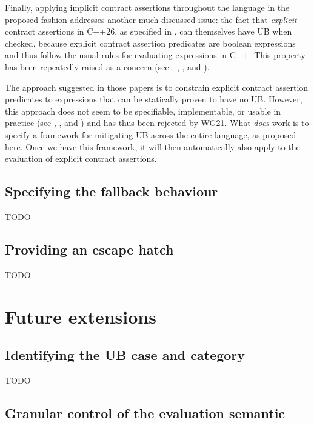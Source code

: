 Finally, applying implicit contract assertions throughout the language in the proposed fashion addresses another much-discussed issue: the fact that \emph{explicit} contract assertions in C++26, as specified in \cite{P2900R14}, can themselves have UB when checked, because explicit contract assertion predicates are boolean expressions and thus follow the usual rules for evaluating expressions in C++. This property has been repeatedly raised as a concern (see \cite{P2680R1}, \cite{P3173R0}, \cite{P3285R0}, and \cite{P3362R0}).

The approach suggested in those papers is to constrain explicit contract assertion predicates to expressions that can be statically proven to have no UB. However, this approach does not seem to be specifiable, implementable, or usable in practice (see  \cite{P3376R0}, \cite{P3386R0}, and \cite{P3499R1}) and has thus been rejected by WG21. What \emph{does} work is to specify a framework for mitigating UB across the entire language, as proposed here. Once we have this framework, it will then automatically also apply to the evaluation of explicit contract assertions.

\subsection{Specifying the fallback behaviour}
\label{specifyfallback}

TODO

\subsection{Providing an escape hatch}
\label{assume}

TODO

\section{Future extensions}
\label{ext}

\subsection{Identifying the UB case and category}
\label{category}

TODO

\subsection{Granular control of the evaluation semantic}
\label{semantic}

